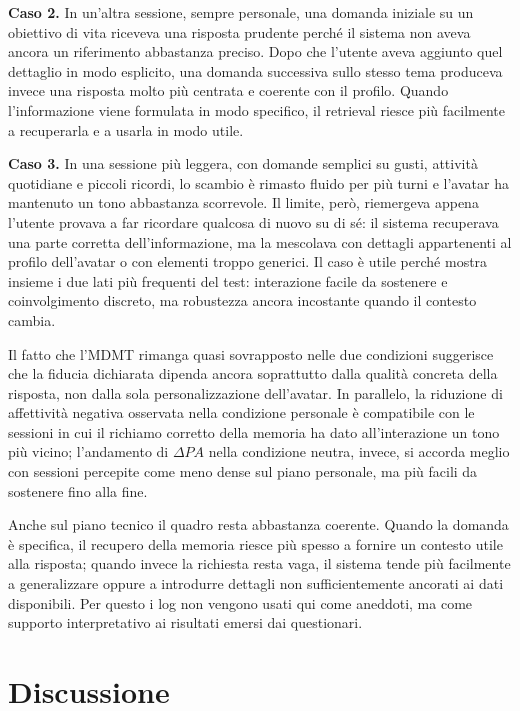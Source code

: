 \textbf{Caso 2.} In un'altra sessione, sempre personale, una domanda iniziale su un obiettivo di vita riceveva una risposta prudente perché il sistema non aveva ancora un riferimento abbastanza preciso. Dopo che l'utente aveva aggiunto quel dettaglio in modo esplicito, una domanda successiva sullo stesso tema produceva invece una risposta molto più centrata e coerente con il profilo. Quando l'informazione viene formulata in modo specifico, il retrieval riesce più facilmente a recuperarla e a usarla in modo utile.

\textbf{Caso 3.} In una sessione più leggera, con domande semplici su gusti, attività quotidiane e piccoli ricordi, lo scambio è rimasto fluido per più turni e l'avatar ha mantenuto un tono abbastanza scorrevole. Il limite, però, riemergeva appena l'utente provava a far ricordare qualcosa di nuovo su di sé: il sistema recuperava una parte corretta dell'informazione, ma la mescolava con dettagli appartenenti al profilo dell'avatar o con elementi troppo generici. Il caso è utile perché mostra insieme i due lati più frequenti del test: interazione facile da sostenere e coinvolgimento discreto, ma robustezza ancora incostante quando il contesto cambia.

Il fatto che l'MDMT rimanga quasi sovrapposto nelle due condizioni suggerisce che la fiducia dichiarata dipenda ancora soprattutto dalla qualità concreta della risposta, non dalla sola personalizzazione dell'avatar. In parallelo, la riduzione di affettività negativa osservata nella condizione personale è compatibile con le sessioni in cui il richiamo corretto della memoria ha dato all'interazione un tono più vicino; l'andamento di $\Delta PA$ nella condizione neutra, invece, si accorda meglio con sessioni percepite come meno dense sul piano personale, ma più facili da sostenere fino alla fine.

Anche sul piano tecnico il quadro resta abbastanza coerente. Quando la domanda è specifica, il recupero della memoria riesce più spesso a fornire un contesto utile alla risposta; quando invece la richiesta resta vaga, il sistema tende più facilmente a generalizzare oppure a introdurre dettagli non sufficientemente ancorati ai dati disponibili. Per questo i log non vengono usati qui come aneddoti, ma come supporto interpretativo ai risultati emersi dai questionari.

\section{Discussione}
\label{sec:empirical-discussion}

